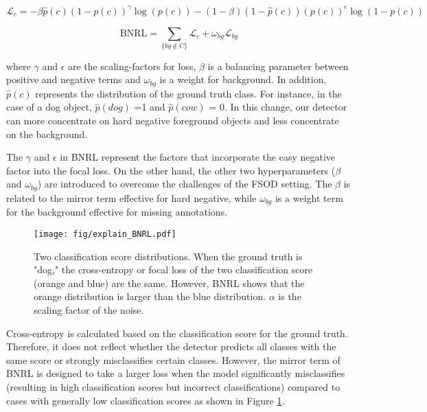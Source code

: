 \documentclass{article}
\begin{document}
\begin{equation}
    \mathcal{L}_c = 
            - 
            \beta \hat{p}(c)(1-p(c))^\gamma \log(p(c)) 
            -
            (1-\beta)(1-\hat{p}(c)) (p(c))^\epsilon \log(1-p(c)) 
    \label{eq:BNRL1}
\end{equation}

\begin{equation}
    \text{BNRL} = \sum_{\{bg \notin C\}}{\mathcal{L}_c} + \omega_{bg}\mathcal{L}_{bg}
    \label{eq:BNRL2}
\end{equation}


where $\gamma$ and $\epsilon$ are the scaling-factors for loss, 
$\beta$ is a balancing parameter between positive and negative terms and $\omega_{bg}$ is a weight for background.
In addition, $\hat{p}(c)$ represents the distribution of the ground truth class. For instance, in the case of a dog object, $\hat{p}(dog)$ =1 and $\hat{p}(cow)$ = 0.
In this change, our detector can more concentrate on hard negative foreground objects and less concentrate on the background.

The $\gamma$ and $\epsilon$ in BNRL represent the factors that incorporate the easy negative factor into the focal loss. On the other hand, the other two hyperparameters ($\beta$ and $\omega_{bg}$) are introduced to overcome the challenges of the FSOD setting. The $\beta$ is related to the mirror term effective for hard negative, while $\omega_{bg}$ is a weight term for the background effective for missing annotations.



\begin{figure}[h]
    \centering
    \texttt{[image: fig/explain\_BNRL.pdf]}
\caption{Two classification score distributions. When the ground truth is "dog," the cross-entropy or focal loss of the two classification score (orange and blue) are the same. However, BNRL shows that the orange distribution is larger than the blue distribution. $\alpha$ is the scaling factor of the noise.
}
\label{fig:BNRLvsCROSS}
\end{figure}

Cross-entropy is calculated based on the classification score for the ground truth. 
Therefore, it does not reflect whether the detector predicts all classes with the same score or strongly misclassifies certain classes.
However, the mirror term of BNRL is designed to take a larger loss when the model significantly misclassifies (resulting in high classification scores but incorrect classifications) compared to cases with generally low classification scores as shown in Figure \ref{fig:BNRLvsCROSS}.
\end{document}
